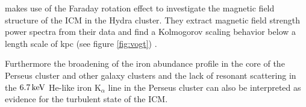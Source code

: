 \citet{Vogt2005} makes
use of the Faraday rotation effect to investigate the magnetic field structure
of the ICM in the Hydra cluster. They extract magnetic field strength power
spectra from their data and find a Kolmogorov scaling behavior below a
length scale of \unit[1]{kpc} (see figure \ref{fig:vogt}) . 

Furthermore the broadening of the iron abundance profile
in the core of the Perseus cluster \citep{Rebusco2005} and other galaxy
clusters \citep{Rebusco2006} and the lack of 
resonant scattering in the $\unit[6.7]{keV}$ He-like iron K$_{\alpha}$ line in
the Perseus cluster \citep{Churazov2004} can also be interpreted as evidence for
the turbulent state of the ICM. 


 

 
